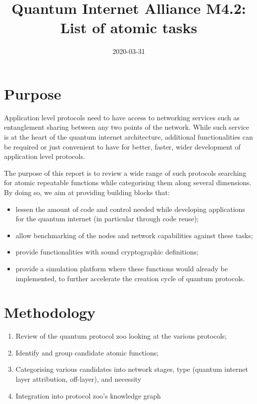 \documentclass[11pt]{article}
\date{2020-03-31}
\title{Quantum Internet Alliance M4.2: List of atomic tasks}
\begin{document}
\maketitle


\section{Purpose}
\label{sec:org083de9c}
Application level protocols need to have access to networking services such as entanglement sharing between any two points of the network. While such service is at the heart of the quantum internet architecture, additional functionalities can be required or just convenient to have for better, faster, wider development of application level protocols. 

The purpose of this report is to review a wide range of such protocols searching for atomic repeatable functions while categorising them along several dimensions. By doing so, we aim at providing building blocks that:
\begin{itemize}
\item lessen the amount of code and control needed while developing applications for the quantum internet (in particular through code reuse);
\item allow benchmarking of the nodes and network capabilities against these tasks;
\item provide functionalities with sound cryptographic definitions;
\item provide a simulation platform where these functions would already be implemented, to further accelerate the creation cycle of quantum protocols.
\end{itemize}

\section{Methodology}
\label{sec:org6117fdc}
\begin{enumerate}
\item Review of the quantum protocol zoo looking at the various protocols;
\item Identify and group candidate atomic functions;
\item Categorising various candidates into network stages, type (quantum internet layer attribution, off-layer), and necessity
\item Integration into protocol zoo's knowledge graph
\end{enumerate}
\end{document}

